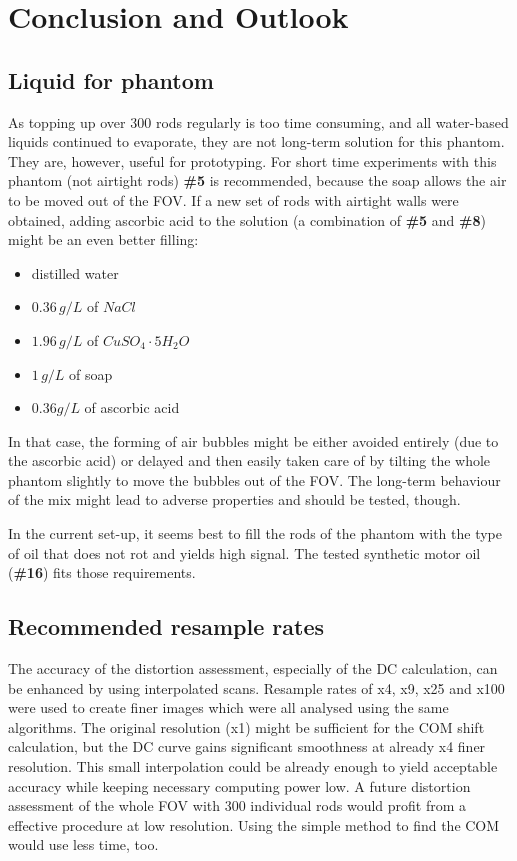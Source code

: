 
\chapter{Conclusion and Outlook}
\section{Liquid for phantom}

As topping up over 300 rods regularly is too time consuming, and all water-based liquids continued to evaporate, they are not long-term solution for this phantom.
They are, however, useful for prototyping.
For short time experiments with this phantom (not airtight rods) \textbf{\#5} is recommended, because the soap allows the air to be moved out of the FOV.
If a new set of rods with airtight walls were obtained, adding ascorbic acid to the solution (a combination of \textbf{\#5} and \textbf{\#8}) might be an even better filling:
\begin{itemize}
\item  distilled water
\item  $0.36 \, g/L$ of $NaCl$
\item  $1.96 \, g/L$ of $CuSO_4\cdot5H_2O$
\item  $1 \, g/L$ of soap
\item  $0.36 g/L$ of ascorbic acid
\end{itemize}
In that case, the forming of air bubbles might be either avoided entirely (due to the ascorbic acid) or delayed and then easily taken care of by tilting the whole phantom slightly to move the bubbles out of the FOV.
The long-term behaviour of the mix might lead to adverse properties and should be tested, though.

In the current set-up, it seems best to fill the rods of the phantom with the type of oil that does not rot and yields high signal.
The tested synthetic motor oil (\textbf{\#16}) fits those requirements.

\section{Recommended resample rates}

The accuracy of the distortion assessment, especially of the DC calculation, can be enhanced by using interpolated scans.
Resample rates of x4, x9, x25 and x100 were used to create finer images which were all analysed using the same algorithms.
The original resolution (x1) might be sufficient for the COM shift calculation, but the DC curve gains significant smoothness at already x4 finer resolution.
This small interpolation could be already enough to yield acceptable accuracy while keeping necessary computing power low.
A future distortion assessment of the whole FOV with 300 individual rods would profit from a effective procedure at low resolution.
Using the simple method to find the COM would use less time, too.


